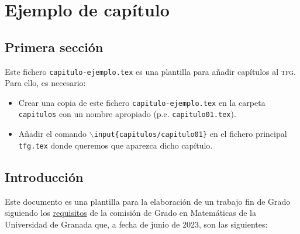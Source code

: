 
\chapter{Ejemplo de capítulo}

\section{Primera sección}

Este fichero \texttt{capitulo-ejemplo.tex} es una plantilla para añadir capítulos al \textsc{tfg}. Para ello, es necesario:
\begin{itemize}
  \item Crear una copia de este fichero \texttt{capitulo-ejemplo.tex} en la carpeta \texttt{capitulos} con un nombre apropiado (p.e. \texttt{capitulo01.tex}).
  \item Añadir el comando \texttt{$\backslash$input\{capitulos/capitulo01\}} en el fichero principal \texttt{tfg.tex} donde queremos que aparezca dicho capítulo.
\end{itemize}

\section{Introducción}
Este documento es una plantilla para la elaboración de un trabajo fin de Grado siguiendo los \href{https://grados.ugr.es/matematicas/pages/infoacademica/tfg/requisitosTFG}{requisitos} de la comisión de Grado en Matemáticas de la Universidad de Granada que, a fecha de junio de 2023, son las siguientes:

